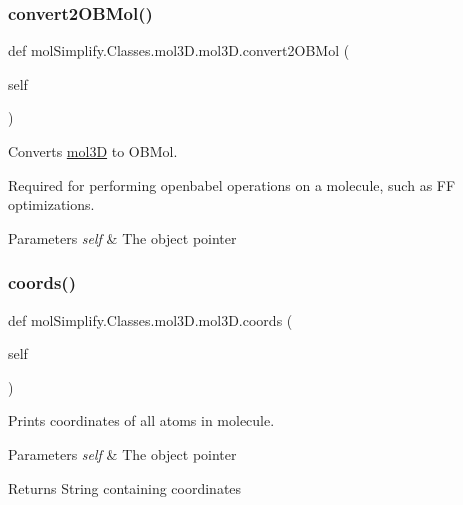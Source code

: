 \subsubsection{\texorpdfstring{convert2\+O\+B\+Mol()}{convert2OBMol()}}
{\footnotesize\ttfamily def mol\+Simplify.\+Classes.\+mol3\+D.\+mol3\+D.\+convert2\+O\+B\+Mol (\begin{DoxyParamCaption}\item[{}]{self }\end{DoxyParamCaption})}



Converts \hyperlink{classmolSimplify_1_1Classes_1_1mol3D_1_1mol3D}{mol3D} to O\+B\+Mol. 

Required for performing openbabel operations on a molecule, such as FF optimizations. 
\begin{DoxyParams}{Parameters}
{\em self} & The object pointer \\
\hline
\end{DoxyParams}
\mbox{\label{classmolSimplify_1_1Classes_1_1mol3D_1_1mol3D_a551393e5c2417086b3b7855be3cf5957}} 
\subsubsection{\texorpdfstring{coords()}{coords()}}
{\footnotesize\ttfamily def mol\+Simplify.\+Classes.\+mol3\+D.\+mol3\+D.\+coords (\begin{DoxyParamCaption}\item[{}]{self }\end{DoxyParamCaption})}



Prints coordinates of all atoms in molecule. 


\begin{DoxyParams}{Parameters}
{\em self} & The object pointer \\
\hline
\end{DoxyParams}
\begin{DoxyReturn}{Returns}
String containing coordinates 
\end{DoxyReturn}
\mbox{\label{classmolSimplify_1_1Classes_1_1mol3D_1_1mol3D_a305748724bd9be10c324302f046e3815}} 
